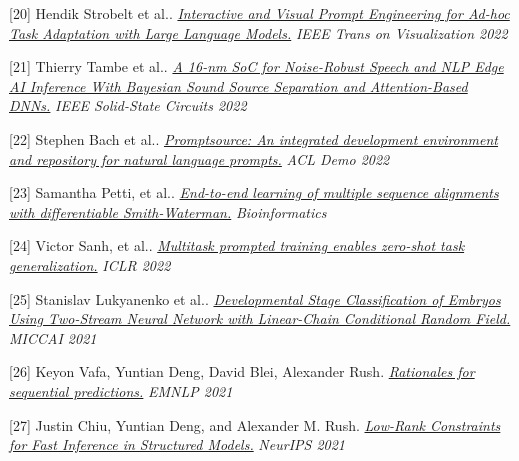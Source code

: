 \documentclass[10pt]{article}
\begin{document}
\medskip


[20] \ind Hendik Strobelt et al.. \emph{\href{ https://ieeexplore.ieee.org/abstract/document/9908590 }{ Interactive and Visual Prompt Engineering for Ad-hoc Task Adaptation with Large Language Models.} }\emph{ IEEE Trans on Visualization 2022 }

\medskip


[21] \ind Thierry Tambe et al.. \emph{\href{ https://discovery.ucl.ac.uk/id/eprint/10150658/1/A_16-nm_SoC_for_Noise-Robust_Speech.pdf }{ A 16-nm SoC for Noise-Robust Speech and NLP Edge AI Inference With Bayesian Sound Source Separation and Attention-Based DNNs.} }\emph{ IEEE Solid-State Circuits 2022 }

\medskip


[22] \ind Stephen Bach et al.. \emph{\href{ https://arxiv.org/abs/2202.01279 }{ Promptsource: An integrated development environment and repository for natural language prompts.} }\emph{ ACL Demo 2022 }

\medskip


[23] \ind Samantha Petti, et al.. \emph{\href{ http://repository.cshl.edu/id/eprint/40409/1/2021.Petti.multiple_sequence_alignments.pdf }{ End-to-end learning of multiple sequence alignments with differentiable Smith-Waterman.} }\emph{ Bioinformatics }

\medskip


[24] \ind Victor Sanh, et al.. \emph{\href{ https://arxiv.org/pdf/2110.08207 }{ Multitask prompted training enables zero-shot task generalization.} }\emph{ ICLR 2022 }

\medskip


[25] \ind Stanislav Lukyanenko et al.. \emph{\href{ https://www.ncbi.nlm.nih.gov/pmc/articles/PMC8526069/ }{ Developmental Stage Classification of Embryos Using Two-Stream Neural Network with Linear-Chain Conditional Random Field.} }\emph{ MICCAI 2021 }

\medskip


[26] \ind Keyon Vafa, Yuntian Deng, David Blei, Alexander Rush. \emph{\href{ https://arxiv.org/pdf/2109.06387 }{ Rationales for sequential predictions.} }\emph{ EMNLP 2021 }

\medskip


[27] \ind Justin Chiu, Yuntian Deng, and Alexander M. Rush. \emph{\href{ https://proceedings.neurips.cc/paper/2021/file/16c0d78ef6a76b5c247113a4c9514059-Paper.pdf }{ Low-Rank Constraints for Fast Inference in Structured Models.} }\emph{ NeurIPS 2021 }

\medskip
\end{document}

